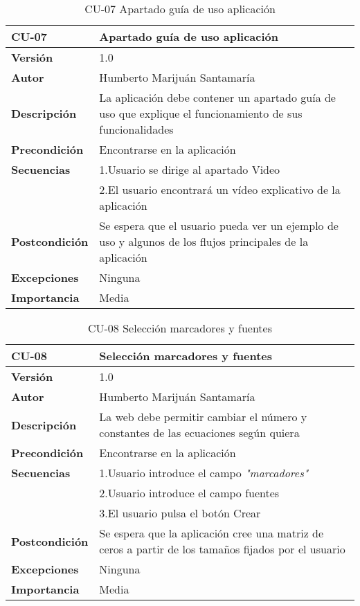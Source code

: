 \begin{table}[th!]
\begin{tabular}{  m{5cm}  m{7cm}  }
\hline \textbf{CU-07} & \textbf{Apartado guía de uso aplicación} \\ 
\hline
\textbf{Versión} & 1.0\\
\textbf{Autor} & Humberto Marijuán Santamaría\\
\textbf{Descripción} & La aplicación debe contener un apartado guía de uso que explique el funcionamiento de sus funcionalidades \\
\textbf{Precondición} & Encontrarse en la aplicación\\
\textbf{Secuencias} & 1.Usuario se dirige al apartado Video \\
                    & 2.El usuario encontrará un vídeo explicativo de la aplicación  \\
\textbf{Postcondición} & Se espera que el usuario pueda ver un ejemplo de uso y algunos de los flujos principales de la aplicación\\
\textbf{Excepciones} & Ninguna\\
\textbf{Importancia} & Media\\
\hline
\end{tabular}
\caption{CU-07 Apartado guía de uso aplicación}
\label{ref:tablacu_07}
\end{table}

\begin{table}[th!]
\begin{tabular}{  m{5cm}  m{7cm}  }
\hline \textbf{CU-08} & \textbf{Selección marcadores y fuentes} \\ 
\hline
\textbf{Versión} & 1.0\\
\textbf{Autor} & Humberto Marijuán Santamaría\\
\textbf{Descripción} & La web debe permitir cambiar el número y constantes de las ecuaciones según quiera \\
\textbf{Precondición} & Encontrarse en la aplicación\\
\textbf{Secuencias} & 1.Usuario introduce el campo \textit{"marcadores"} \\
                    & 2.Usuario introduce el campo fuentes \\
                    & 3.El usuario pulsa el botón Crear  \\
\textbf{Postcondición} & Se espera que la aplicación cree una matriz de ceros a partir de los tamaños fijados por el usuario\\
\textbf{Excepciones} & Ninguna\\
\textbf{Importancia} & Media\\
\hline
\end{tabular}
\caption{CU-08 Selección marcadores y fuentes}
\label{ref:tablacu_08}
\end{table}

